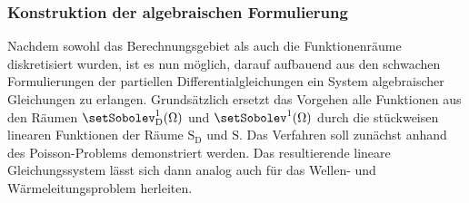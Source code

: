 \documentclass[crop=false]{standalone}
\begin{document}
      \subsubsection{Konstruktion der algebraischen Formulierung}
        Nachdem sowohl das Berechnungsgebiet als auch die Funktionenräume diskretisiert wurden, ist es nun möglich, darauf aufbauend aus den schwachen Formulierungen der partiellen Differentialgleichungen ein System algebraischer Gleichungen zu erlangen.
        Grundsätzlich ersetzt das Vorgehen alle Funktionen aus den Räumen $\setSobolev^1_\mathrm{D}(\domain)$ und $\setSobolev^1(\domain)$ durch die stückweisen linearen Funktionen der Räume $\mathrm{S}_\mathrm{D}$ und $\mathrm{S}$.
        Das Verfahren soll zunächst anhand des Poisson-Problems demonstriert werden.
        Das resultierende lineare Gleichungssystem lässt sich dann analog auch für das Wellen- und Wärmeleitungsproblem herleiten.
\end{document}
